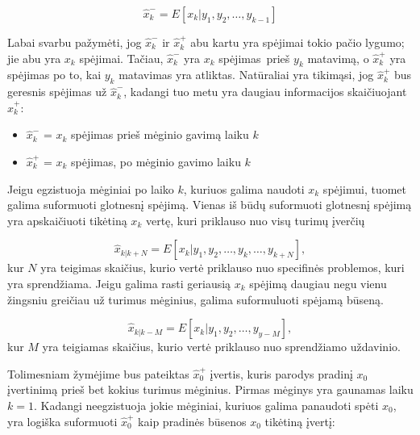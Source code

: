\documentclass[12pt, a4paper, lithuanian]{article}
\begin{document}
        \begin{equation}
            \hat{x}_k^{-} = E[x_k|y_1,y_2,\dots, y_{k-1}]
        \end{equation}

        Labai svarbu pažymėti, jog $\hat{x}^-_k$ ir $\hat{x}_k^{+}$ abu kartu yra spėjimai tokio pačio lygumo; jie abu yra $x_k$ spėjimai.
        Tačiau, $\hat{x}_k^-$ yra $x_k$ spėjimas prieš $y_k$ matavimą, o $\hat{x}_k^+$ yra spėjimas po to, kai $y_k$ matavimas yra atliktas.
        Natūraliai yra tikimąsi, jog $\hat{x}_k^+$ bus geresnis spėjimas už $\hat{x}_k^-$, kadangi tuo metu yra daugiau informacijos skaičiuojant $\hat{x}_k^+$:

        \begin{itemize}
            \item $\hat{x}_k^-$ = $x_k$ spėjimas prieš mėginio gavimą laiku $k$
            \item $\hat{x}_k^+$ = $x_k$ spėjimas, po mėginio gavimo laiku $k$
        \end{itemize}

        Jeigu egzistuoja mėginiai po laiko $k$, kuriuos galima naudoti $x_k$ spėjimui, tuomet galima suformuoti glotnesnį spėjimą.
        Vienas iš būdų suformuoti glotnesnį spėjimą yra apskaičiuoti tikėtiną $x_k$ vertę, kuri priklauso nuo visų turimų įverčių

        \begin{equation}
            \hat{x}_{k|k+N} = E[x_k|y_1,y_2,\dots,y_k,\dots, y_{k+N}],
        \end{equation}
        kur $N$ yra teigimas skaičius, kurio vertė priklauso nuo specifinės problemos, kuri yra sprendžiama.
        Jeigu galima rasti geriausią $x_k$ spėjimą daugiau negu vienu žingsniu greičiau už turimus mėginius, galima suformuluoti spėjamą būseną.

        \begin{equation}
            \hat{x}_{k|k-M} = E[x_k|y_1,y_2, \dots, y_{y-M}],
        \end{equation}
        kur $M$ yra teigiamas skaičius, kurio vertė priklauso nuo sprendžiamo uždavinio. 

        Tolimesniam žymėjime bus pateiktas $\hat{x}_0^+$ įvertis, kuris parodys pradinį $x_0$ įvertinimą prieš bet kokius turimus mėginius.
        Pirmas mėginys yra gaunamas laiku $k=1$.
        Kadangi neegzistuoja jokie mėginiai, kuriuos galima panaudoti spėti $x_0$, yra logiška suformuoti $\hat{x}^+_0$ kaip pradinės būsenos $x_0$ tikėtiną įvertį:
\end{document}
